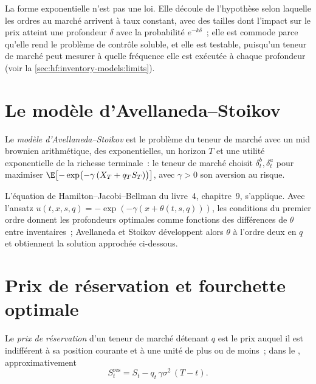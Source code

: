 La forme exponentielle n'est pas une loi. Elle découle de l'hypothèse selon laquelle les ordres au marché arrivent à taux constant, avec des tailles dont l'impact sur le prix atteint une
profondeur $\delta$ avec la probabilité $e^{-k\delta}$~; elle est commode parce qu'elle rend le problème de contrôle soluble, et elle est testable, puisqu'un teneur de marché peut
mesurer à quelle fréquence elle est exécutée à chaque profondeur (voir la \cref{sec:hf:inventory-models:limits}).

\section{Le modèle d'Avellaneda--Stoikov}

\begin{definition}\label{def:hf:inventory-models:as}
Le \emph{modèle d'Avellaneda--Stoikov} est le problème du teneur de marché avec un mid brownien arithmétique, des
 exponentielles, un horizon $T$ et une utilité exponentielle de la richesse terminale~: le teneur de marché choisit $\delta^b_t,\delta^a_t$ pour maximiser
$\E\bigl[-\exp\bigl(-\gamma\,(X_T+q_TS_T)\bigr)\bigr]$, avec $\gamma>0$ son aversion au risque.
\end{definition}

\begin{sloppypar}L'équation de Hamilton--Jacobi--Bellman du livre~4, chapitre~9, s'applique. Avec l'ansatz $u(t,x,s,q)=-\exp(-\gamma(x+\theta(t,s,q)))$, les
conditions du premier ordre donnent les profondeurs optimales comme fonctions des différences de $\theta$ entre inventaires~; Avellaneda et Stoikov développent alors
$\theta$ à l'ordre deux en $q$ et obtiennent la solution approchée ci-dessous.\end{sloppypar}

\section{Prix de réservation et fourchette optimale}

\begin{definition}\label{def:hf:inventory-models:reservation}
Le \emph{prix de réservation} d'un teneur de marché détenant $q$ est le prix auquel il est indifférent à sa position
courante et à une unité de plus ou de moins~; dans le , approximativement
\[
S^{\mathrm{res}}_t=S_t-q_t\,\gamma\sigma^2\,(T-t).
\]
\end{definition}

